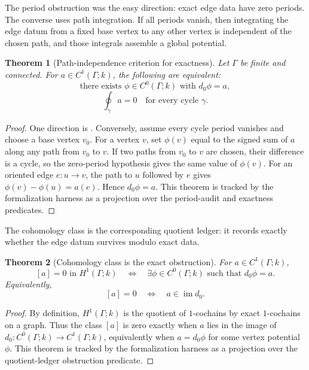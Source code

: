 \documentclass[11pt]{article}
\newcommand{\im}{\operatorname{im}}
\newtheorem{theorem}{Theorem}[section]
\theoremstyle{definition}
\begin{document}
The period obstruction was the easy direction: exact edge data have zero periods.
The converse uses path integration.  If all periods vanish, then integrating the
edge datum from a fixed base vertex to any other vertex is independent of the
chosen path, and those integrals assemble a global potential.

\begin{theorem}[Path-independence criterion for exactness]
\label{thm:coh-periods-iff-exact}
Let \(\Gamma\) be finite and connected.  For \(a\in C^1(\Gamma;k)\), the following are equivalent:
\[
\text{there exists }\phi\in C^0(\Gamma;k)\text{ with }d_0\phi=a,
\]
\[
\oint_\gamma a=0\quad\text{for every cycle }\gamma.
\]
\end{theorem}

\begin{proof}
One direction is .  Conversely, assume every
cycle period vanishes and choose a base vertex \(v_0\).  For a vertex \(v\), set
\(\phi(v)\) equal to the signed sum of \(a\) along any path from \(v_0\) to
\(v\).  If two paths from \(v_0\) to \(v\) are chosen, their difference is a
cycle, so the zero-period hypothesis gives the same value of \(\phi(v)\).  For
an oriented edge \(e:u\to v\), the path to \(u\) followed by \(e\) gives
\(\phi(v)-\phi(u)=a(e)\).  Hence \(d_0\phi=a\).  This theorem is tracked by the
formalization harness as a projection over the period-audit and exactness
predicates.
\end{proof}

The cohomology class is the corresponding quotient ledger: it records exactly
whether the edge datum survives modulo exact data.

\begin{theorem}[Cohomology class is the exact obstruction]
\label{thm:coh-class-obstruction}
For \(a\in C^1(\Gamma;k)\),
\[
[a]=0\text{ in }H^1(\Gamma;k)
\quad\Longleftrightarrow\quad
\exists \phi\in C^0(\Gamma;k)\text{ such that }d_0\phi=a.
\]
Equivalently,
\[
[a]=0
\quad\Longleftrightarrow\quad
a\in\im d_0.
\]
\end{theorem}

\begin{proof}
By definition, \(H^1(\Gamma;k)\) is the quotient of \(1\)-cochains by exact
\(1\)-cochains on a graph.  Thus the class \([a]\) is zero exactly when \(a\)
lies in the image of \(d_0:C^0(\Gamma;k)\to C^1(\Gamma;k)\), equivalently when
\(a=d_0\phi\) for some vertex potential \(\phi\).  This theorem is tracked by
the formalization harness as a projection over the quotient-ledger obstruction
predicate.
\end{proof}
\end{document}
